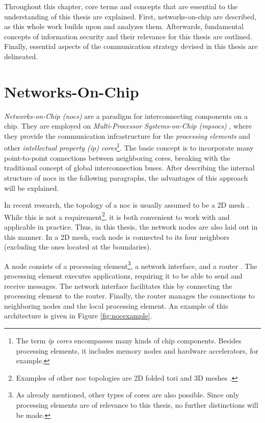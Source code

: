 Throughout this chapter, core terms and concepts that are essential to the understanding of this thesis are explained. First, networks-on-chip are
described, as this whole work builds upon and analyzes them. Afterwards, fundamental concepts of information security and their relevance for this
thesis are outlined. Finally, essential aspects of the communication strategy devised in this thesis are delineated.

\section{Networks-On-Chip}\label{sec:networkonchipfun}
\textit{Networks-on-Chip (\glspl{noc})} are a paradigm for interconnecting components on a chip. They are employed on
\textit{Multi-Processor Systems-on-Chip (\glspl{mpsoc})} \cites(e.g.)(){ivanov05nocintroduction}{biswas15routerattack}{tatas16designingnocs}, where they
provide the communication infrastructure for the \textit{processing elements} and other \textit{intellectual property (\gls{ip}) cores}\footnote{The
term \textit{\gls{ip} cores} encompasses many kinds of chip components. Besides processing elements, it includes memory nodes and hardware
accelerators, for example.}. The basic concept is to incorporate many point-to-point connections between neighboring cores, breaking with the traditional
concept of global interconnection buses. After describing the internal structure of \glspl{noc} in the following paragraphs, the advantages of this
approach will be explained.

In recent research, the topology of a \gls{noc} is usually assumed to be a 2D mesh
\cites(e.g.)(){frey17hardenednoc}{kumar02networkonchip}{fernandes16nocrouting}{boraten16packetsecurity}. While this is not a
requirement\footnote{Examples of other \gls{noc} topologies are 2D folded tori and 3D meshes \cite[2]{feero07noc3d}.}, it is both convenient
to work with and applicable in practice. Thus, in this thesis, the network nodes are also laid out in this manner.
In a 2D mesh, each node is connected to its four neighbors (excluding the ones located at the boundaries).

A node consists of a processing element\footnote{As already mentioned, other types of cores are also possible. Since only processing elements are of
relevance to this thesis, no further distinctions will be made.}, a network interface, and a router \cite{dally01routepacketsnotwires}. The processing
element executes applications, requiring it to be able to send and receive messages. The network interface facilitates this by connecting the
processing element to the router. Finally, the router manages the connections to neighboring nodes and the local processing element. An example of
this architecture is given in Figure \vref{fig:nocexample}.

